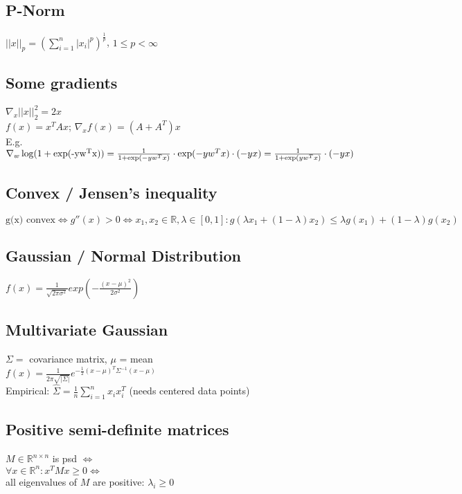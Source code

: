 \documentclass[11pt]{article}
\begin{document}
\begin{multicols*}{3}
	\subsection*{P-Norm}
	$||x||_p = (\sum_{i=1}^n|x_i|^p)^{\frac{1}{p}}$, $1 \leq p < \infty$
	
	\subsection*{Some gradients}
	$\nabla_x ||x||_2^2 = 2 x$\\
	$f(x) = x^T A x$; $\nabla_x f(x) = (A + A^T) x$\\
	E.g. $\nabla_w \operatorname{log}(1+\operatorname{exp(-y w^T x)}) = \\
	\frac{1}{1+\operatorname{exp}(-y w^T x)} \cdot \operatorname{exp}(-y w^T x) \cdot (-y x) = \\
	\frac{1}{1 + \operatorname{exp}(y w^T x)} \cdot(-yx)$\\
	
	
	\subsection*{Convex / Jensen's inequality}
	$\text{g(x) convex} \Leftrightarrow g''(x) > 0 \Leftrightarrow x_1,x_2 \in \mathbb{R}, \lambda \in [0,1]: 
	g(\lambda x_1 + (1-\lambda) x_2) \leq \lambda g(x_1) + (1-\lambda) g(x_2)$
	
	\subsection*{Gaussian / Normal Distribution}
	$f(x) = \frac{1}{\sqrt{2\pi\sigma^2}} exp(-\frac{(x-\mu)^2}{2\sigma^2})$
	
	\subsection*{Multivariate Gaussian}
	$\Sigma =$ covariance matrix, $\mu$ = mean\\
	$f(x) = \frac{1}{2\pi \sqrt{|\Sigma|}} e^{- \frac{1}{2} (x-\mu)^T \Sigma^{-1} (x-\mu)}$\\
	Empirical: $\hat{\Sigma} = \frac{1}{n}\sum_{i=1}^n x_i x_i^T$ (needs centered data points)
	
	\subsection*{Positive semi-definite matrices}
	$M \in \mathbb{R}^{n\times n}$ is psd $\Leftrightarrow$\\
	$\forall x \in \mathbb{R}^n: x^TMx \geq 0 \Leftrightarrow$\\
	all eigenvalues of $M$ are positive: $\lambda_i\geq 0$
	
		
	\end{multicols*}
	
\end{document}
